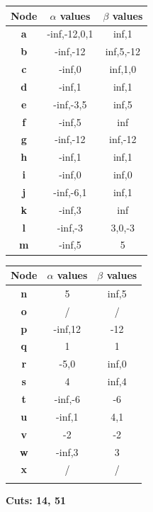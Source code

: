 \documentclass[11pt,a4paper]{report}
\begin{document}
\begin{answers}[8cm]
    \begin{multicols}{2}
    \begin{tabular}{ccc}
    Node & $\alpha$ values & $\beta$ values\\
    \hline
    \textbf{a} &-inf,-12,0,1  &inf,1 \\ %
    \textbf{b} &-inf,-12  &inf,5,-12  \\
    \textbf{c} &-inf,0  &inf,1,0  \\
    \textbf{d} &-inf,1  &inf,1  \\
    \textbf{e} &-inf,-3,5 &inf,5  \\
    \textbf{f} &-inf,5  &inf  \\
    \textbf{g} &-inf,-12  &inf,-12  \\
    \textbf{h} &-inf,1  &inf,1  \\
    \textbf{i} &-inf,0  &inf,0  \\
    \textbf{j} &-inf,-6,1  &inf,1  \\
    \textbf{k} &-inf,3  &inf  \\
    \textbf{l} &-inf,-3  &3,0,-3  \\
    \textbf{m} &-inf,5  &5  \\ 
    \end{tabular}
    
    \begin{tabular}{ccc}
    Node & $\alpha$ values & $\beta$ values\\
    \hline
    \textbf{n} &5  &inf,5  \\
    \textbf{o} &/  &/  \\
    \textbf{p} &-inf,12  &-12  \\
    \textbf{q} &1  &1  \\
    \textbf{r} &-5,0  &inf,0  \\
    \textbf{s} &4  &inf,4  \\
    \textbf{t} &-inf,-6  &-6  \\
    \textbf{u} &-inf,1  &4,1  \\
    \textbf{v} &-2  &-2  \\
    \textbf{w} &-inf,3  &3  \\
    \textbf{x} &/  &/  \\
     &  &  \\
    \end{tabular}
    \end{multicols}
    
\textbf{Cuts: 14, 51} %
\end{answers}
\end{document}
